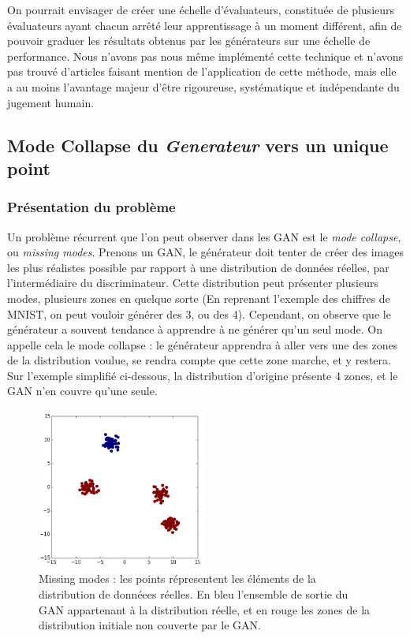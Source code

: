 On pourrait envisager de créer une échelle d'évaluateurs, constituée de plusieurs évaluateurs ayant chacun arrêté leur apprentissage à un moment différent, afin de pouvoir graduer les résultats obtenus par les générateurs sur une échelle de performance. Nous n'avons pas nous même implémenté cette technique et n'avons pas trouvé d'articles faisant mention de l'application de cette méthode, mais elle a au moins l'avantage majeur d'être rigoureuse, systématique et indépendante du jugement humain.

\subsection{Mode Collapse du \textit{Generateur} vers un unique point}
\subsubsection{Présentation du problème}

Un problème récurrent que l'on peut observer dans les GAN est le \textit{mode collapse}, ou \textit{missing modes}. Prenons un GAN, le générateur doit tenter de créer des images les plus réalistes possible par rapport à une distribution de données réelles, par l'intermédiaire du discriminateur. Cette distribution peut présenter plusieurs modes, plusieurs zones en quelque sorte (En reprenant l'exemple des chiffres de MNIST, on peut vouloir générer des 3, ou des 4). 
Cependant, on observe que le générateur a souvent tendance à apprendre à ne générer qu'un seul mode. On appelle cela le mode collapse : le générateur apprendra à aller vers une des zones de la distribution voulue, se rendra compte que cette zone marche, et y restera. 
Sur l'exemple simplifié ci-dessous, la distribution d'origine présente 4 zones, et le GAN n'en couvre qu'une seule. 

\begin{figure}[h]
\begin{center}
\includegraphics[width=0.5\textwidth]{images/missing_modes.png}\caption{Missing modes : les points répresentent les éléments de la distribution de donnéees réelles. En bleu l'ensemble de sortie du GAN appartenant à la distribution réelle, et en rouge les zones de la distribution initiale non couverte par le GAN.}
\end{center}
\end{figure} 

